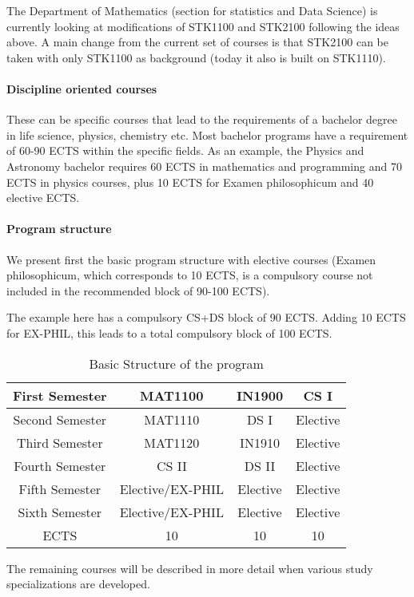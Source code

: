 \documentclass[oneside,final,10pt]{article}
\begin{document}
The Department of Mathematics
(section for statistics and Data Science) is currently looking at modifications of STK1100 and STK2100 following the ideas above. A main change from the current set of courses is that STK2100 can be taken with only STK1100 as background (today it also is built on STK1110).

\paragraph{Discipline oriented courses}

These can be specific courses that lead to the requirements of a bachelor degree in life science, physics, chemistry etc. Most bachelor programs have a requirement of 60-90 ECTS within the specific fields. As an example, the Physics and Astronomy bachelor requires 60 ECTS in mathematics and programming and 70 ECTS in physics courses, plus 10 ECTS for Examen philosophicum and 40 elective ECTS.  



\paragraph{Program structure}
We present first the basic program structure with elective courses (Examen philosophicum, which corresponds to 10 ECTS, is a compulsory course not included in the recommended block of 90-100 ECTS).

The example here has a compulsory CS+DS block of 90 ECTS. Adding 10 ECTS for EX-PHIL, this leads to a total compulsory block of 100 ECTS. 

\begin{table}[hbtp]
 \caption{Basic Structure of the program}
    \centering
    \begin{tabular}{|c|c|c|c|} \hline
    First Semester & MAT1100 &  IN1900   & CS I  \\ \hline 
    Second Semester & MAT1110 &  DS I   & Elective \\ \hline
    Third Semester & MAT1120 &  IN1910   &  Elective\\ \hline
    Fourth Semester & CS II & DS II    & Elective \\ \hline       
    Fifth Semester & Elective/EX-PHIL & Elective     & Elective \\ \hline
    Sixth Semester & Elective/EX-PHIL & Elective    & Elective \\ \hline
   ECTS & 10 &  10   &  10  \\ \hline    
    \end{tabular}
  
The remaining courses will be described in more detail when various study specializations are developed.   
\end{table}
\end{document}
